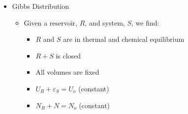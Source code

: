 \begin{itemize}
    \begin{itemize}

        $$\text{dependent thermodynamic functions}\to\left\{\begin{array}{l l l} \sigma&= &\sigma(\overbrace{U,V,N}^{\text{nat. ind. vars}})\\U&=&U(\,\,\,\,\sigma,V,N\,\,\,)\\F&=&F(\,\,\,\,\tau,V,N\,\,\,)\end{array}$$

        \item The differentials for these may be written as:

          $$d\sigma=\overbrace{\left(\frac{\partial \sigma}{\partial U}\right)_{V,N}}^{\frac{1}{\tau}}\,dU+\overbrace{\left( \frac{\partial \sigma}{\partial V} \right)_{U,N}}^{\frac{P}{\tau}}\,dV+\overbrace{\left( \frac{\partial \sigma}{\partial N} \right)_{U,V}}^{-\frac{\mu}{\tau}}\,dN$$
          $$dU=\overbrace{\left( \frac{\partial U}{\partial \sigma} \right)_{V,N}}^{\tau}\,d\sigma+\overbrace{\left( \frac{\partial U}{\partial V} \right)_{\sigma,N}}^P\,dV+\overbrace{\left( \frac{\partial U}{\partial N} \right)_{\sigma,V}}^{\mu}\,dN$$
          $$dF=\underbrace{\left( \frac{\partial F}{\partial \tau} \right)_{V,N}}_{?}\,d\tau+\underbrace{\left( \frac{\partial F}{\partial V} \right)_{\tau,N}}_{-P}\,dV+\underbrace{\left( \frac{\partial F}{\partial N} \right)_{\tau,V}}_{\mu}\,dN$$

    \end{itemize}

  \item Gibbs Distribution

    \begin{itemize}

      \item Given a reservoir, $R$, and system, $S$, we find:

        \begin{itemize}

          \item $R$ and $S$ are in thermal and chemical equilibrium

          \item $R+S$ is closed

          \item All volumes are fixed

          \item $U_R+\varepsilon_S=U_o$ (constant)

          \item $N_R+N=N_o$ (constant)


\end{itemize}
\end{itemize}
\end{itemize}

